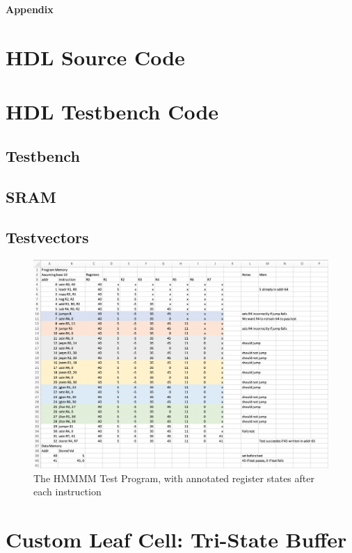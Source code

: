 \documentclass[12pt]{article}
\begin{document}
\clearpage
\begin{appendices}
    \LARGE\textbf{Appendix}
    \section{HDL Source Code}
    \clearpage
    \section{HDL Testbench Code}
    \subsection{Testbench}
    \clearpage
    \subsection{SRAM}
    \clearpage
    \subsection{Testvectors}
    \begin{figure}[H]
        \begin{center}
        \includegraphics[width=16cm]{HMMMTestvectors.png}
        \caption{The HMMMM Test Program, with annotated register states after each instruction}
        \end{center}
    \end{figure}
    \clearpage
    \section{Custom Leaf Cell: Tri-State Buffer}

\end{appendices}
\end{document}
